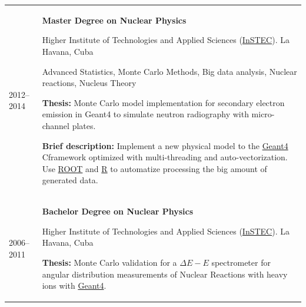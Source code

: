 \documentclass[a4paper,10pt]{article}
\def\CC{{C\nolinebreak[4]\hspace{-.05em}\raisebox{.2ex}{++}}}
\begin{document}
\begin{tabularx}{\linewidth}{@{}l X@{}}
  2012--2014 & \textbf{Master Degree on Nuclear Physics}

               Higher Institute of Technologies and Applied Sciences (\href{www.instec.cu}{InSTEC}).
               La Havana, Cuba

               Advanced Statistics, Monte Carlo Methods, Big data analysis, Nuclear reactions, Nucleus Theory

               \textbf{Thesis:} Monte Carlo model implementation for secondary electron emission in Geant4 to
               simulate neutron radiography with micro-channel plates.

               \textbf{Brief description:} Implement a new physical model to the
               \href{https://geant4.web.cern.ch/}{Geant4} \CC framework optimized with multi-threading
               and auto-vectorization. Use \href{https://root.cern/}{ROOT} and
               \href{https://www.r-project.org/}{R} to automatize processing the big amount of
               generated data.
  \\
  2006--2011 & \textbf{Bachelor Degree on Nuclear Physics}

               Higher Institute of Technologies and Applied Sciences (\href{www.instec.cu}{InSTEC}).
               La Havana, Cuba

               \textbf{Thesis:} Monte Carlo validation for a $\Delta E-E$ spectrometer for angular
               distribution measurements of Nuclear Reactions with heavy ions with
               \href{https://geant4.web.cern.ch/}{Geant4}.
  \\
\end{tabularx}

\end{document}
